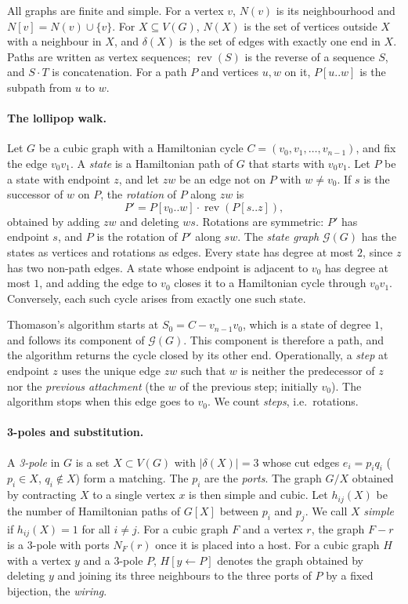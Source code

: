 \documentclass[11pt]{article}
\theoremstyle{definition}
\newcommand{\rev}{\operatorname{rev}}
\newcommand{\cG}{\mathcal{G}}
\begin{document}
All graphs are finite and simple. For a vertex $v$, $N(v)$ is its neighbourhood and
$N[v] = N(v) \cup \{v\}$. For $X \subseteq V(G)$, $N(X)$ is the set of vertices outside $X$ with a
neighbour in $X$, and $\delta(X)$ is the set of edges with exactly one end in $X$. Paths are
written as vertex sequences; $\rev(S)$ is the reverse of a sequence $S$, and $S \cdot T$ is
concatenation. For a path $P$ and vertices $u, w$ on it, $P[u..w]$ is the subpath from $u$ to $w$.

\paragraph{The lollipop walk.} Let $G$ be a cubic graph with a Hamiltonian cycle
$C = (v_0, v_1, \dots, v_{n-1})$, and fix the edge $v_0v_1$. A \emph{state} is a Hamiltonian path
of $G$ that starts with $v_0 v_1$. Let $P$ be a state with endpoint $z$, and let $zw$ be an edge
not on $P$ with $w \ne v_0$. If $s$ is the successor of $w$ on $P$, the \emph{rotation} of $P$
along $zw$ is
\[
P' = P[v_0..w] \cdot \rev(P[s..z]),
\]
obtained by adding $zw$ and deleting $ws$. Rotations are symmetric: $P'$ has endpoint $s$, and $P$
is the rotation of $P'$ along $sw$. The \emph{state graph} $\cG(G)$ has the states as vertices
and rotations as edges. Every state has degree at most $2$, since $z$ has two non-path edges. A
state whose endpoint is adjacent to $v_0$ has degree at most $1$, and adding the edge to $v_0$
closes it to a Hamiltonian cycle through $v_0v_1$. Conversely, each such cycle arises from exactly
one such state.

Thomason's algorithm starts at $S_0 = C - v_{n-1}v_0$, which is a state of degree $1$, and
follows its component of $\cG(G)$. This component is therefore a path, and the algorithm returns
the cycle closed by its other end. Operationally, a \emph{step} at endpoint $z$ uses the unique
edge $zw$ such that $w$ is neither the predecessor of $z$ nor the \emph{previous attachment}
(the $w$ of the previous step; initially $v_0$). The algorithm stops when this edge goes to $v_0$.
We count \emph{steps}, i.e.\ rotations.

\paragraph{3-poles and substitution.} A \emph{3-pole} in $G$ is a set $X \subset V(G)$ with
$|\delta(X)| = 3$ whose cut edges $e_i = p_i q_i$ ($p_i \in X$, $q_i \notin X$) form a matching.
The $p_i$ are the \emph{ports}. The graph $G/X$ obtained by contracting $X$ to a single vertex $x$
is then simple and cubic. Let $h_{ij}(X)$ be the number of Hamiltonian paths of $G[X]$ between
$p_i$ and $p_j$. We call $X$ \emph{simple} if $h_{ij}(X) = 1$ for all $i \ne j$. For a cubic graph
$F$ and a vertex $r$, the graph $F - r$ is a 3-pole with ports $N_F(r)$ once it is placed into a
host. For a cubic graph $H$ with a vertex $y$ and a 3-pole $P$, $H[y \leftarrow P]$ denotes the
graph obtained by deleting $y$ and joining its three neighbours to the three ports of $P$ by a
fixed bijection, the \emph{wiring}.
\end{document}
